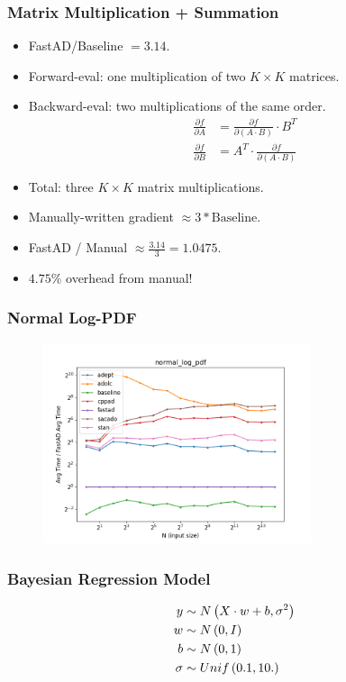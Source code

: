 \begin{frame}
\frametitle{Matrix Multiplication + Summation}
\begin{itemize}

\item FastAD/Baseline $= 3.14$.
\item Forward-eval: one multiplication of two $K\times K$ matrices.
\item Backward-eval: two multiplications of the same order.
    \begin{align*}
        \frac{\partial f}{\partial A} 
        &= \frac{\partial f}{\partial (A\cdot B)} \cdot B^T \\
        \frac{\partial f}{\partial B} 
        &= A^T \cdot \frac{\partial f}{\partial (A\cdot B)}
    \end{align*}
\item Total: three $K\times K$ matrix multiplications.
\item Manually-written gradient $\approx 3 * \text{Baseline}$.
\item FastAD / Manual $\approx \frac{3.14}{3} = 1.0475$.
\item $ 4.75\%$ overhead from manual!

\end{itemize}
\end{frame}

\begin{frame}
\frametitle{Normal Log-PDF}
\begin{figure}
    \includegraphics[width=0.7\textwidth]{../../figs/normal_log_pdf_fig.png}
\end{figure}
\end{frame}

\begin{frame}
\frametitle{Bayesian Regression Model}
\begin{align*}
    y &\sim N\left(X\cdot w + b, \sigma^2\right) \\
    w &\sim N\left(0,I\right) \\
    b &\sim N\left(0,1\right) \\
    \sigma &\sim Unif\left(0.1, 10.\right)
\end{align*}
\end{frame}

